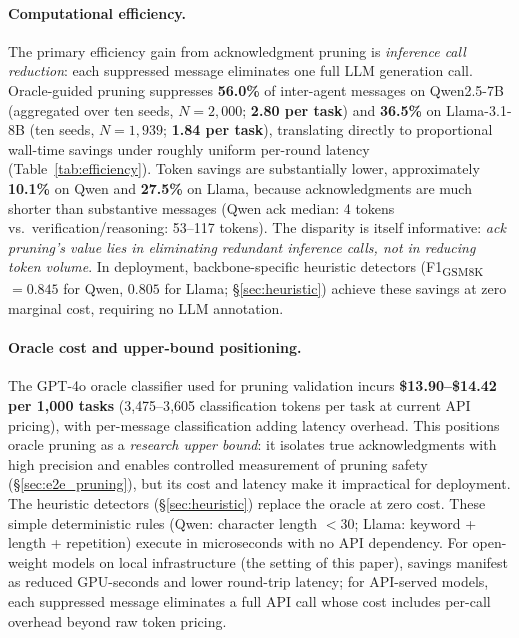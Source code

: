 
\paragraph{Computational efficiency.}
The primary efficiency gain from acknowledgment pruning is \emph{inference call reduction}: each suppressed message eliminates one full LLM generation call.
Oracle-guided pruning suppresses \textbf{56.0\%} of inter-agent messages on Qwen2.5-7B (aggregated over ten seeds, $N{=}2{,}000$; \textbf{2.80 per task}) and \textbf{36.5\%} on Llama-3.1-8B (ten seeds, $N{=}1{,}939$; \textbf{1.84 per task}), translating directly to proportional wall-time savings under roughly uniform per-round latency (Table~\ref{tab:efficiency}).
Token savings are substantially lower, approximately \textbf{10.1\%} on Qwen and \textbf{27.5\%} on Llama, because acknowledgments are much shorter than substantive messages (Qwen ack median: 4 tokens vs.\ verification/reasoning: 53--117 tokens).
The disparity is itself informative: \emph{ack pruning's value lies in eliminating redundant inference calls, not in reducing token volume}.
In deployment, backbone-specific heuristic detectors (F1\textsubscript{GSM8K} $= 0.845$ for Qwen, $0.805$ for Llama; \S\ref{sec:heuristic}) achieve these savings at zero marginal cost, requiring no LLM annotation.

\paragraph{Oracle cost and upper-bound positioning.}
The GPT-4o oracle classifier used for pruning validation incurs \textbf{\$13.90--\$14.42 per 1{,}000 tasks} (3{,}475--3{,}605 classification tokens per task at current API pricing), with per-message classification adding latency overhead.
This positions oracle pruning as a \emph{research upper bound}: it isolates true acknowledgments with high precision and enables controlled measurement of pruning safety (\S\ref{sec:e2e_pruning}), but its cost and latency make it impractical for deployment.
The heuristic detectors (\S\ref{sec:heuristic}) replace the oracle at zero cost. These simple deterministic rules (Qwen: character length $< 30$; Llama: keyword + length + repetition) execute in microseconds with no API dependency.
For open-weight models on local infrastructure (the setting of this paper), savings manifest as reduced GPU-seconds and lower round-trip latency; for API-served models, each suppressed message eliminates a full API call whose cost includes per-call overhead beyond raw token pricing.

